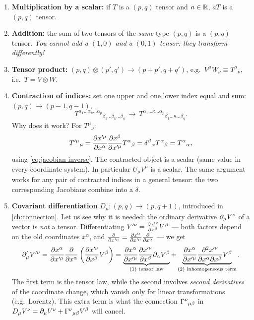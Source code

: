 \begin{enumerate}[label=(\roman*)]
\item \textbf{Multiplication by a scalar:} if $T$ is a $(p,q)$ tensor and $a\in\mathbb{R}$, $aT$ is a $(p,q)$ tensor.
\item \textbf{Addition:} the sum of two tensors of the \emph{same} type $(p,q)$ is a $(p,q)$ tensor. \emph{You cannot add a $(1,0)$ and a $(0,1)$ tensor: they transform differently!}
\item \textbf{Tensor product:} $(p,q)\otimes(p',q')\to(p+p',q+q')$, e.g.\ $V^\mu W_\nu\equiv T^\mu{}_\nu$, i.e.\ $T=V\otimes W$.
\item \textbf{Contraction of indices:} set one upper and one lower index equal and sum: $(p,q)\to(p-1,q-1)$,
\[
  T^{\alpha_1\dots\alpha_k\dots\alpha_p}{}_{\beta_1\dots\beta_k\dots\beta_q}\ \longrightarrow\ T^{\alpha_1\dots\kappa\dots\alpha_p}{}_{\beta_1\dots\kappa\dots\beta_q}.
\]
Why does it work? For $T^\mu{}_\nu$:
\[
  T'^\mu{}_\mu=\frac{\partial x'^\mu}{\partial x^\alpha}\frac{\partial x^\beta}{\partial x'^\mu}T^\alpha{}_\beta=\delta^\beta{}_\alpha T^\alpha{}_\beta=T^\alpha{}_\alpha ,
\]
using \eqref{eq:jacobian-inverse}. The contracted object is a scalar (same value in every coordinate system). In particular $U_\mu V^\mu$ is a scalar. The same argument works for any pair of contracted indices in a general tensor: the two corresponding Jacobians combine into a $\delta$.
\item \textbf{Covariant differentiation} $D_\mu:(p,q)\to(p,q+1)$, introduced in \cref{ch:connection}. Let us see why it is needed: the ordinary derivative $\partial_\mu V^\nu$ of a vector is \emph{not} a tensor. Differentiating $V'^\nu=\frac{\partial x'^\nu}{\partial x^\beta}V^\beta$ --- both factors depend on the old coordinates $x^\alpha$, and $\frac{\partial}{\partial x'^\mu}=\frac{\partial x^\alpha}{\partial x'^\mu}\frac{\partial}{\partial x^\alpha}$ --- we get
\begin{equation}
  \partial'_\mu V'^\nu=\frac{\partial x^\alpha}{\partial x'^\mu}\frac{\partial}{\partial x^\alpha}\left(\frac{\partial x'^\nu}{\partial x^\beta}V^\beta\right)
  =\underbrace{\frac{\partial x^\alpha}{\partial x'^\mu}\frac{\partial x'^\nu}{\partial x^\beta}\partial_\alpha V^\beta}_{\text{(1) tensor law}}
  +\underbrace{\frac{\partial x^\alpha}{\partial x'^\mu}\frac{\partial^2x'^\nu}{\partial x^\alpha\partial x^\beta}V^\beta}_{\text{(2) inhomogeneous term}} .
  \label{eq:partial-not-tensor}
\end{equation}
The first term is the tensor law, while the second involves \emph{second derivatives} of the coordinate change, which vanish only for linear transformations (e.g.\ Lorentz). This extra term is what the connection $\Gamma^{\nu}{}_{\mu\beta}$ in $D_\mu V^\nu=\partial_\mu V^\nu+\Gamma^{\nu}{}_{\mu\beta}V^\beta$ will cancel.
\end{enumerate}

